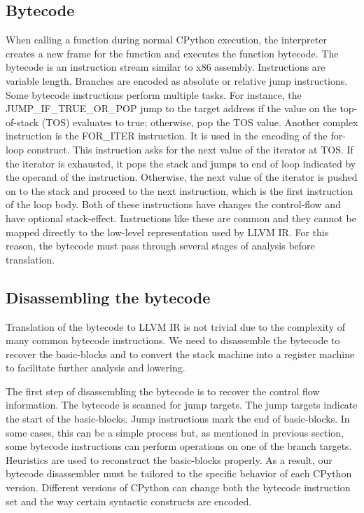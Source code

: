 \documentclass{acm_proc_article-sp}
\begin{document}
\subsection{Bytecode}

When calling a function during normal CPython execution, the
interpreter creates a new frame for the function and executes the
function bytecode.  The bytecode is an instruction stream similar to
x86 assembly.  Instructions are variable length. Branches are encoded
as absolute or relative jump instructions. Some bytecode instructions
perform multiple tasks.  For instance, the
JUMP\_IF\_TRUE\_OR\_POP jump to the target address if the
value on the top-of-stack (TOS) evaluates to true; otherwise, pop the
TOS value.  Another complex instruction is the FOR\_ITER instruction.
It is used in the encoding of the for-loop construct.  This
instruction asks for the next value of the iterator at TOS.  If the
iterator is exhausted, it pops the stack and jumps to end of loop
indicated by the operand of the instruction.  Otherwise, the next
value of the iterator is pushed on to the stack and proceed to the
next instruction, which is the first instruction of the loop
body. Both of these instructions have changes the control-flow and
have optional stack-effect. \cite{pythondoc:dis} Instructions like
these are common and they cannot be mapped directly to the low-level
representation used by LLVM IR.  For this reason, the bytecode must
pass through several stages of analysis before translation.

\subsection{Disassembling the bytecode}

Translation of the bytecode to LLVM IR is not trivial due to the
complexity of many common bytecode instructions.  We need to disassemble
the bytecode to recover the basic-blocks and to convert the stack machine into
a register machine to facilitate further analysis and lowering.

The first step of disassembling the bytecode is to recover the control
flow information. The bytecode is scanned for jump targets. The jump
targets indicate the start of the basic-blocks.  Jump instructions
mark the end of basic-blocks. In some cases, this can be a simple
process but, as mentioned in previous section, some bytecode
instructions can perform operations on one of the branch targets.
Heuristics are used to reconstruct the basic-blocks properly. As a
result, our bytecode disassembler must be tailored to the specific
behavior of each CPython version.  Different versions of CPython can
change both the bytecode instruction set and the way certain syntactic
constructs are encoded.
\end{document}

